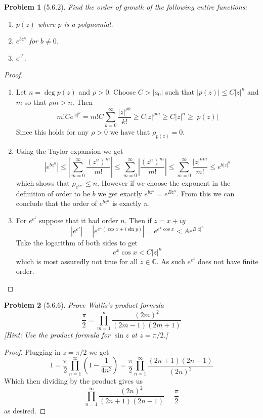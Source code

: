 \documentclass[10pt]{article}
\newcommand{\sk}{\vskip 10mm}
\newcommand{\bb}[1]{\mathbb{#1}}
\theoremstyle{plain}
\newtheorem{problem}{Problem}
\theoremstyle{remark}
\begin{document}
\begin{problem}[5.6.2]
  Find the order of growth of the following entire functions:
  \begin{enumerate}
  \item[(a)] $p(z)$ where $p$ is a polynomial.
  \item[(b)] $e^{bz^n}$ for $b\neq 0$.
  \item[(c)] $e^{e^z}$.
  \end{enumerate}
\end{problem}

\begin{proof}
  \begin{enumerate}
  \item[(a)] Let $n=\deg p(z)$ and $\rho>0$. Choose $C>|a_0|$ such that $|p(z)|\leq C|z|^n$
    and $m$ so that $\rho m>n$. Then
    \[
      m!Ce^{|z|^\rho}=m!C\sum_{k=0}^\infty\frac{|z|^{\rho k}}{k!}\geq C|z|^{\rho m}\geq C|z|^n\geq|p(z)|
    \]
    Since this holds for any $\rho>0$ we have that $\rho_{p(z)}=0$.
  \item[(b)] Using the Taylor expansion we get
    \[
      |e^{bz^n}|\leq|\sum_{m=0}^\infty\frac{(z^n)^m}{m!}|\leq\sum_{m=0}^\infty|\frac{(z^n)^m}{m!}|\leq\sum_{m=0}^\infty\frac{|z|^{nm}}{m!}\leq e^{b|z|^n}
    \]
    which shows that $\rho_{e^{bz^n}}\leq n$. However if we choose the exponent in the
    definition of order to be $b$ we get exactly $e^{bz^n}=e^{Bz^n}$. From this
    we can conclude that the order of $e^{bz^n}$ is exactly $n$.

  \item[(c)] For $e^{e^z}$ suppose that it had order $n$. Then if $z=x+iy$
    \[
      |e^{e^z}|=|e^{e^x(\cos x+i\sin y)}|=e^{e^x\cos x}< Ae^{B|z|^n}
    \]
    Take the logarithm of both sides to get
    \[
      e^x\cos x < C|z|^n
    \]
    which is most assuredly not true for all $z\in\bb{C}$. As
    such $e^{e^z}$ does not have finite order.
  \end{enumerate}
\end{proof}

\sk

\begin{problem}[5.6.6]
  Prove Wallis's product formula
  \[
    \frac{\pi}{2}=\prod_{m=1}^\infty\frac{(2m)^2}{(2m-1)(2m+1)}
  \]
  [Hint: Use the product formula for $\sin z$ at $z=\pi/2$.]
\end{problem}

\begin{proof}
  Plugging in $z=\pi/2$ we get
  \[
    1=\frac{\pi}{2}\prod_{n=1}^\infty(1-\frac{1}{4n^2})=\frac{\pi}{2}\prod_{n=1}^\infty\frac{(2n+1)(2n-1)}{(2n)^2}
  \]
  Which then dividing by the product gives us
  \[
    \prod_{n=1}^\infty\frac{(2n)^2}{(2n+1)(2n-1)}=\frac{\pi}{2}
  \]
  as desired.
\end{proof}
\end{document}
